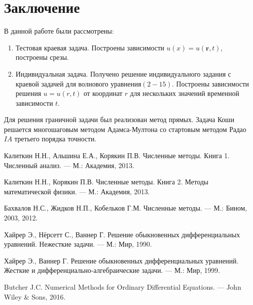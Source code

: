 \documentclass[a4paper,12pt]{article}
\begin{document}
\newpage
\section*{Заключение}
В данной работе были рассмотрены:
 \begin{enumerate}
 	\item Тестовая краевая задача. Построены зависимости $u(x) = u(\textbf{r} , t)$, построены срезы.
 	\item Индивидуальная задача. Получено решение индивидуального задания с краевой задачей для волнового уравнения$(2 - 15)$.
 	Построены зависимости решения \qquad $u = u(r, t)$ от координат $r$ для нескольких значений временной зависимости $t$.
 \end{enumerate}
Для решения граничной задачи был реализован метод прямых. Задача Коши решается многошаговым методом Адамса-Мултона со стартовым методом Радао $IA$ третьего порядка точности.\\



\newpage
{}
\begin{thebibliography}{99}

Калиткин Н.Н., Альшина Е.А., Корякин П.В. 
Численные методы. Книга 1. Численный анализ. --- М.: Академия, 2013. 

Калиткин Н.Н., Корякин П.В. 
Численные методы. Книга 2. Методы математической физики. --- М.: Академия, 2013. 

Бахвалов Н.С., Жидков Н.П., Кобельков Г.М. 
Численные методы. --- М.: Бином, 2003, 2012.

Хайрер Э., Нёрсетт С., Ваннер Г. 
Решение обыкновенных дифференциальных уравнений. 
Нежесткие задачи. --- М.: Мир, 1990.

Хайрер Э., Ваннер Г. 
Решение обыкновенных дифференциальных уравнений. 
Жесткие и дифференциально-алгебраические задачи. --- М.: Мир, 1999.

Butcher J.C. Numerical Methods for Ordinary Differential Equations. --- 
John Wiley \& Sons, 2016.

\end{thebibliography}
\end{document}
